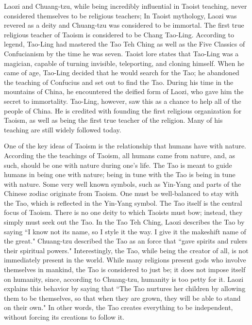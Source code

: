 \documentclass[12pt]{article}
\begin{document}
Laozi and Chuang-tzu, while being incredibly influential in Taoist teaching, never considered themselves to be religious teachers; In Taoist mythology, Laozi was revered as a deity and Chuang-tzu was considered to be immortal. The first true religious teacher of Taoism is considered to be Chang Tao-Ling. According to legend, Tao-Ling had mastered the Tao Teh Ching as well as the Five Classics of Confucianism by the time he was seven. Taoist lore states that Tao-Ling was a magician, capable of turning invisible, teleporting, and cloning himself. When he came of age, Tao-Ling decided that he would search for the Tao; he abandoned the teaching of Confucius and set out to find the Tao. During his time in the mountains of China, he encountered the deified form of Laozi, who gave him the secret to immortality. Tao-Ling, however, saw this as a chance to help all of the people of China. He is credited with founding the first religious organization for Taoism, as well as being the first true teacher of the religion. Many of his teaching are still widely followed today.

One of the key ideas of Taoism is the relationship that humans have with nature. According the the teachings of Taoism, all humans came from nature, and, as such, should be one with nature during one's life. The Tao is meant to guide humans in being one with nature; being in tune with the Tao is being in tune with nature. Some very well known symbols, such as Yin-Yang and parts of the Chinese zodiac originate from Taoism. One must be well-balanced to stay with the Tao, which is reflected in the Yin-Yang symbol. The Tao itself is the central focus of Taoism. There is no one deity to which Taoists must bow; instead, they simply must seek out the Tao. In the Tao Teh Ching, Laozi describes the Tao by saying
``I know not its name, so I style it the way. I give it the makeshift name of the great."
Chuang-tzu described the Tao as an force that
``gave spirits and rulers their spiritual powers."
Interestingly, the Tao, while being the creator of all, is not immediately present in the world. While many religions present gods who involve themselves in mankind, the Tao is considered to just be; it does not impose itself on humanity, since, according to Chuang-tzu, humanity is too petty for it. Laozi explains this behavior by saying that ``The Tao nurtures her children by allowing them to be themselves, so that when they are grown, they will be able to stand on their own."
In other words, the Tao creates everything to be independent, without forcing its creations to follow it.
\end{document}
